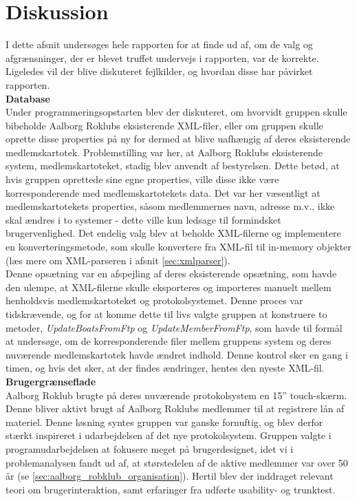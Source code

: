 
\chapter{Diskussion}
\label{sec:Diskussion}
I dette afsnit undersøges hele rapporten for at finde ud af, om de valg og afgrænsninger, der er blevet truffet undervejs i rapporten, var de korrekte. Ligeledes vil der blive diskuteret fejlkilder, og hvordan disse har påvirket rapporten.\\

\textbf{Database}\\
Under programmeringsopstarten blev der diskuteret, om hvorvidt gruppen skulle bibeholde Aalborg Roklubs eksisterende XML-filer, eller om gruppen skulle oprette disse properties på ny for dermed at blive uafhængig af deres eksisterende medlemskartotek. Problemstilling var her, at Aalborg Roklubs eksisterende system, medlemskartoteket, stadig blev anvendt af bestyrelsen. Dette betød, at hvis gruppen oprettede sine egne properties, ville disse ikke være korresponderende med medlemskartotekets data. Det var her væsentligt at medlemskartotekets properties, såsom medlemmernes navn, adresse m.v., ikke skal ændres i to systemer - dette ville kun ledsage til formindsket brugervenlighed. Det endelig valg blev at beholde XML-filerne og implementere en konverteringsmetode, som skulle konvertere fra XML-fil til in-memory objekter (læs mere om XML-parseren i afsnit \ref{sec:xmlparser}).\\

Denne opsætning var en afspejling af deres eksisterende opsætning, som havde den ulempe, at XML-filerne skulle eksporteres og importeres manuelt mellem henholdsvis medlemskartoteket og protokolsystemet. Denne proces var tidskrævende, og for at komme dette til livs valgte gruppen at konstruere to metoder, \textit{UpdateBoatsFromFtp} og \textit{UpdateMemberFromFtp}, som havde til formål at undersøge, om de korresponderende filer mellem gruppens system og deres nuværende medlemskartotek havde ændret indhold. Denne kontrol sker en gang i timen, og hvis det sker, at der findes ændringer, hentes den nyeste XML-fil.\\

\textbf{Brugergrænseflade}\\
Aalborg Roklub brugte på deres nuværende protokolsystem en 15” touch-skærm. Denne bliver aktivt brugt af Aalborg Roklubs medlemmer til at registrere lån af materiel. Denne løsning syntes gruppen var ganske fornuftig, og blev derfor stærkt inspireret i udarbejdelsen af det nye protokolsystem. Gruppen valgte i programudarbejdelsen at fokusere meget på brugerdesignet, idet vi i problemanalysen fandt ud af, at størstedelen af de aktive medlemmer var over 50 år (se \ref{sec:aalborg_robklub_organisation}). Hertil blev der inddraget relevant teori om brugerinteraktion, samt erfaringer fra udførte usability- og trunktest. \\

